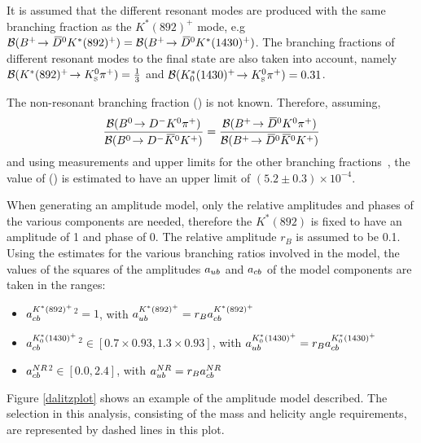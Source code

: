 It is assumed that the different resonant \Kstarp modes are produced with the same branching fraction as the $K^*(892)^+$ mode, e.g ${\mathcal{B}}({{{B}^+}}\!\rightarrow {\ensuremath{{\kern 0.2em\overline{\kern -0.2em D}{}}{}^0}} K^*(892)^+) = {\mathcal{B}}({{{B}^+}}\!\rightarrow {\ensuremath{{\kern 0.2em\overline{\kern -0.2em D}{}}{}^0}} K^*(1430)^+)$. The branching fractions of different resonant \Kstarp modes to the \KS\pip final state are also taken into account, namely ${\mathcal{B}}(K^*(892)^+\!\rightarrow {\ensuremath{{K}^0_{\mathrm{ \scriptscriptstyle S}}}}{\ensuremath{{\pi}^+}}) = \frac{1}{3}$ and ${\mathcal{B}}(K^*_0(1430)^+\!\rightarrow {\ensuremath{{K}^0_{\mathrm{ \scriptscriptstyle S}}}}{\ensuremath{{\pi}^+}}) = 0.31$.

The non-resonant branching fraction \BR(\decay{\Bp}{\Dzb\KS\pip}) is not known. Therefore, assuming,
\begin{equation*}
\frac{{\mathcal{B}}({{B}^0}\!\rightarrow {\ensuremath{{D}^-}}{\ensuremath{{K}^0}}{\ensuremath{{\pi}^+}})}{{\mathcal{B}}({{B}^0}\!\rightarrow {\ensuremath{{D}^-}}{\ensuremath{{\kern 0.2em\overline{\kern -0.2em K}{}}{}^0}}{\ensuremath{{K}^+}})} = \frac{{\mathcal{B}}({{{B}^+}}\!\rightarrow {\ensuremath{{\kern 0.2em\overline{\kern -0.2em D}{}}{}^0}}{\ensuremath{{K}^0}}{\ensuremath{{\pi}^+}})}{{\mathcal{B}}({{{B}^+}}\!\rightarrow {\ensuremath{{\kern 0.2em\overline{\kern -0.2em D}{}}{}^0}}{\ensuremath{{\kern 0.2em\overline{\kern -0.2em K}{}}{}^0}}{\ensuremath{{K}^+}})}
\end{equation*}
and using measurements and upper limits for the other branching fractions~\cite{PDG2014}, the value of \BR(\decay{\Bp}{\Dzb\KS\pip}) is estimated to have an upper limit of $(5.2 \pm 0.3) \times 10^{-4}$.

When generating an amplitude model, only the relative amplitudes and phases of the various components are needed, therefore the $K^*(892)$ is fixed to have an amplitude of 1 and phase of 0. The relative amplitude $r_B$ is assumed to be 0.1. Using the estimates for the various branching ratios involved in the model, the values of the squares of the amplitudes $a_{{u}{b}}$ and $a_{{c}{b}}$ of the model components are taken in the ranges:

\begin{itemize}
\item \textbar $a_{{c}{b}}^{K^*(892)^+}$\textbar$^2 = 1$, \hspace{12pt} with $a_{{u}{b}}^{K^*(892)^+} = r_B a_{{c}{b}}^{K^*(892)^+}$
\item \textbar $a_{{c}{b}}^{K^*_0(1430)^+}$\textbar$^2 \in [0.7 \times 0.93,1.3 \times 0.93]$, \hspace{14pt} with $a_{{u}{b}}^{K^*_0(1430)^+} = r_B a_{{c}{b}}^{K^*_0(1430)^+}$
\item \textbar $a_{{c}{b}}^{NR}$\textbar$^2 \in [0.0,2.4]$, \hspace{12pt} with $a_{{u}{b}}^{NR} = r_B a_{{c}{b}}^{NR}$
\end{itemize}

Figure \ref{dalitzplot} shows an example of the amplitude model described. The \Kstar selection in this analysis, consisting of the \Kstar mass and \KS helicity angle requirements, are represented by dashed lines in this plot.


